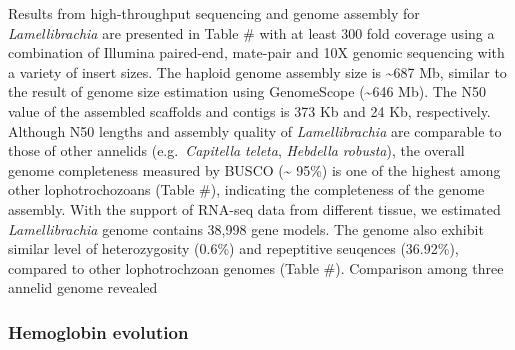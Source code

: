 \documentclass[]{article}
\begin{document}
Results from high-throughput sequencing and genome assembly for
\emph{Lamellibrachia} are presented in Table \# with at least 300 fold
coverage using a combination of Illumina paired-end, mate-pair and 10X
genomic sequencing with a variety of insert sizes. The haploid genome
assembly size is \textasciitilde{}687 Mb, similar to the result of
genome size estimation using GenomeScope (\textasciitilde{}646 Mb). The
N50 value of the assembled scaffolds and contigs is 373 Kb and 24 Kb,
respectively. Although N50 lengths and assembly quality of
\emph{Lamellibrachia} are comparable to those of other annelids
(e.g.~\emph{Capitella} \emph{teleta}, \emph{Hebdella} \emph{robusta}),
the overall genome completeness measured by BUSCO (\textasciitilde{}
95\%) is one of the highest among other lophotrochozoans (Table \#),
indicating the completeness of the genome assembly. With the support of
RNA-seq data from different tissue, we estimated \emph{Lamellibrachia}
genome contains 38,998 gene models. The genome also exhibit similar
level of heterozygosity (0.6\%) and repeptitive seuqences (36.92\%),
compared to other lophotrochzoan genomes (Table \#). Comparison among
three annelid genome revealed

\hypertarget{hemoglobin-evolution}{%
\subsubsection{Hemoglobin evolution}\label{hemoglobin-evolution}}
\end{document}
